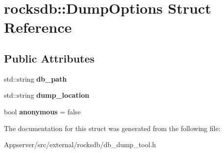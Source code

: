 \hypertarget{structrocksdb_1_1DumpOptions}{}\section{rocksdb\+:\+:Dump\+Options Struct Reference}
\label{structrocksdb_1_1DumpOptions}
\subsection*{Public Attributes}
\begin{DoxyCompactItemize}
\item 
std\+::string {\bfseries db\+\_\+path}\hypertarget{structrocksdb_1_1DumpOptions_a72310b22f0d53835da17d63dedc9a8d5}{}\label{structrocksdb_1_1DumpOptions_a72310b22f0d53835da17d63dedc9a8d5}

\item 
std\+::string {\bfseries dump\+\_\+location}\hypertarget{structrocksdb_1_1DumpOptions_a44c9b1d8293560f56acfd9a317a3ff53}{}\label{structrocksdb_1_1DumpOptions_a44c9b1d8293560f56acfd9a317a3ff53}

\item 
bool {\bfseries anonymous} = false\hypertarget{structrocksdb_1_1DumpOptions_a7a770d37e506260e4603c745e602322d}{}\label{structrocksdb_1_1DumpOptions_a7a770d37e506260e4603c745e602322d}

\end{DoxyCompactItemize}


The documentation for this struct was generated from the following file\+:\begin{DoxyCompactItemize}
\item 
Appserver/src/external/rocksdb/db\+\_\+dump\+\_\+tool.\+h\end{DoxyCompactItemize}
